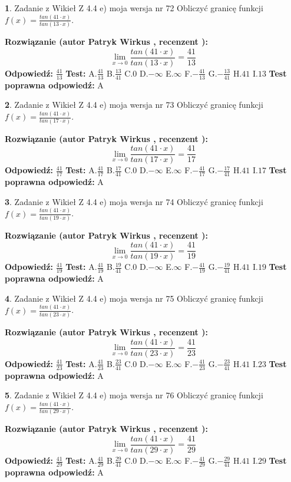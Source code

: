 \documentclass[12pt, a4paper]{article}
\theoremstyle{definition} %
\newtheorem{zad}{}
\newcommand{\zadStart}[1]{\begin{zad}#1\newline}
\newcommand{\zadStop}{\end{zad}}
\newcommand{\rozwStart}[2]{\noindent \textbf{Rozwiązanie (autor #1 , recenzent #2): }\newline}
\newcommand{\rozwStop}{\newline}
\newcommand{\odpStart}{\noindent \textbf{Odpowiedź:}\newline}
\newcommand{\odpStop}{\newline}
\newcommand{\testStart}{\noindent \textbf{Test:}\newline}
\newcommand{\testStop}{\newline}
\newcommand{\kluczStart}{\noindent \textbf{Test poprawna odpowiedź:}\newline}
\newcommand{\kluczStop}{\newline}
\begin{document}
\zadStart{Zadanie z Wikieł Z 4.4 e) moja wersja nr 72}
Obliczyć granicę funkcji $f(x)=\frac{tan(41\cdot x)}{tan(13\cdot x)}$.
\zadStop
\rozwStart{Patryk Wirkus}{}
$$\lim\limits_{x\to 0}\frac{tan(41\cdot x)}{tan(13\cdot x)}=
\frac{41}{13}$$
\rozwStop
\odpStart
$\frac{41}{13}$
\odpStop
\testStart
A.$\frac{41}{13}$
B.$\frac{13}{41}$
C.$0$
D.$-\infty$
E.$\infty$
F.$-\frac{41}{13}$
G.$-\frac{13}{41}$
H.$41$
I.$13$
\testStop
\kluczStart
A
\kluczStop



\zadStart{Zadanie z Wikieł Z 4.4 e) moja wersja nr 73}
Obliczyć granicę funkcji $f(x)=\frac{tan(41\cdot x)}{tan(17\cdot x)}$.
\zadStop
\rozwStart{Patryk Wirkus}{}
$$\lim\limits_{x\to 0}\frac{tan(41\cdot x)}{tan(17\cdot x)}=
\frac{41}{17}$$
\rozwStop
\odpStart
$\frac{41}{17}$
\odpStop
\testStart
A.$\frac{41}{17}$
B.$\frac{17}{41}$
C.$0$
D.$-\infty$
E.$\infty$
F.$-\frac{41}{17}$
G.$-\frac{17}{41}$
H.$41$
I.$17$
\testStop
\kluczStart
A
\kluczStop



\zadStart{Zadanie z Wikieł Z 4.4 e) moja wersja nr 74}
Obliczyć granicę funkcji $f(x)=\frac{tan(41\cdot x)}{tan(19\cdot x)}$.
\zadStop
\rozwStart{Patryk Wirkus}{}
$$\lim\limits_{x\to 0}\frac{tan(41\cdot x)}{tan(19\cdot x)}=
\frac{41}{19}$$
\rozwStop
\odpStart
$\frac{41}{19}$
\odpStop
\testStart
A.$\frac{41}{19}$
B.$\frac{19}{41}$
C.$0$
D.$-\infty$
E.$\infty$
F.$-\frac{41}{19}$
G.$-\frac{19}{41}$
H.$41$
I.$19$
\testStop
\kluczStart
A
\kluczStop



\zadStart{Zadanie z Wikieł Z 4.4 e) moja wersja nr 75}
Obliczyć granicę funkcji $f(x)=\frac{tan(41\cdot x)}{tan(23\cdot x)}$.
\zadStop
\rozwStart{Patryk Wirkus}{}
$$\lim\limits_{x\to 0}\frac{tan(41\cdot x)}{tan(23\cdot x)}=
\frac{41}{23}$$
\rozwStop
\odpStart
$\frac{41}{23}$
\odpStop
\testStart
A.$\frac{41}{23}$
B.$\frac{23}{41}$
C.$0$
D.$-\infty$
E.$\infty$
F.$-\frac{41}{23}$
G.$-\frac{23}{41}$
H.$41$
I.$23$
\testStop
\kluczStart
A
\kluczStop



\zadStart{Zadanie z Wikieł Z 4.4 e) moja wersja nr 76}
Obliczyć granicę funkcji $f(x)=\frac{tan(41\cdot x)}{tan(29\cdot x)}$.
\zadStop
\rozwStart{Patryk Wirkus}{}
$$\lim\limits_{x\to 0}\frac{tan(41\cdot x)}{tan(29\cdot x)}=
\frac{41}{29}$$
\rozwStop
\odpStart
$\frac{41}{29}$
\odpStop
\testStart
A.$\frac{41}{29}$
B.$\frac{29}{41}$
C.$0$
D.$-\infty$
E.$\infty$
F.$-\frac{41}{29}$
G.$-\frac{29}{41}$
H.$41$
I.$29$
\testStop
\kluczStart
A
\kluczStop
\end{document}
